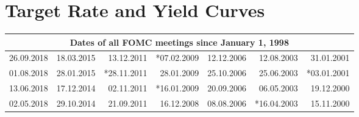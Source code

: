 \documentclass[11pt,a4paper,english,oneside]{book}
\numberwithin{equation}{chapter}
\begin{document}
\renewcommand{\theequation}{A.\arabic{equation}}


\chapter{Target Rate and Yield Curves}\label{AppendixA}
\vspace{-0.5cm}

\begin{table}[h] %
	\centering %
	\begin{tabular}{r r r r r r r } %
		\toprule %
		\multicolumn{7}{c}{Dates of all FOMC meetings since January 1, 1998} \\
		\midrule %
						26.09.2018 & 18.03.2015 & 13.12.2011 & *07.02.2009 & 12.12.2006 & 12.08.2003 & 31.01.2001 \\
						01.08.2018 & 28.01.2015 & *28.11.2011 & 28.01.2009 & 25.10.2006 & 25.06.2003 & *03.01.2001 \\
						13.06.2018 & 17.12.2014 & 02.11.2011 & *16.01.2009 & 20.09.2006 & 06.05.2003 & 19.12.2000 \\
						02.05.2018 & 29.10.2014 & 21.09.2011 & 16.12.2008 & 08.08.2006 & *16.04.2003 & 15.11.2000 \\

\end{tabular}
\end{table}
\end{document}
